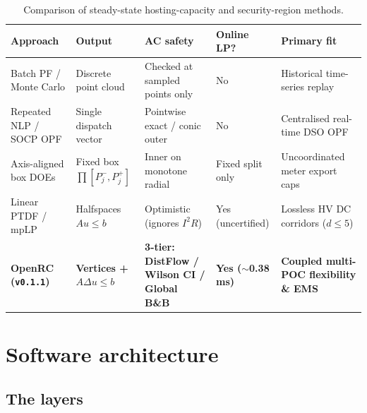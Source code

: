 \documentclass[11pt,a4paper]{report}
\newcommand{\code}[1]{\texttt{\small #1}}
\begin{document}
\begin{table}[htbp]
\centering\small
\caption{Comparison of steady-state hosting-capacity and security-region methods.}
\label{tab:peers}
\begin{tabular}{@{}>{\raggedright\arraybackslash}p{3.0cm}>{\raggedright\arraybackslash}p{2.7cm}>{\raggedright\arraybackslash}p{3.2cm}>{\raggedright\arraybackslash}p{2.0cm}>{\raggedright\arraybackslash}p{3.1cm}@{}}
\toprule
\textbf{Approach} & \textbf{Output} & \textbf{AC safety} & \textbf{Online LP?} & \textbf{Primary fit} \\
\midrule
Batch PF / Monte Carlo & Discrete point cloud & Checked at sampled points only & No & Historical time-series replay \\
Repeated NLP / SOCP OPF & Single dispatch vector & Pointwise exact / conic outer & No & Centralised real-time DSO OPF \\
Axis-aligned box DOEs & Fixed box $\prod [P_j^-, P_j^+]$ & Inner on monotone radial & Fixed split only & Uncoordinated meter export caps \\
Linear PTDF / mpLP & Halfspaces $Au \le b$ & Optimistic (ignores $I^2R$) & Yes (uncertified) & Lossless HV DC corridors ($d \le 5$) \\
\textbf{OpenRC (\code{v0.1.1})} & \textbf{Vertices + $A\Delta u \le b$} & \textbf{3-tier: DistFlow / Wilson CI / Global B\&B} & \textbf{Yes ($\sim$0.38\,ms)} & \textbf{Coupled multi-POC flexibility \& EMS} \\
\bottomrule
\end{tabular}
\end{table}

\chapter{Software architecture}
\label{ch:architecture}

\section{The layers}
\end{document}
